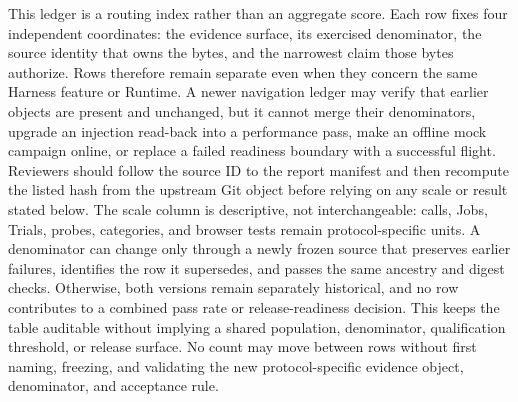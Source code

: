 This ledger is a routing index rather than an aggregate score. Each row fixes
four independent coordinates: the evidence surface, its exercised denominator,
the source identity that owns the bytes, and the narrowest claim those bytes
authorize. Rows therefore remain separate even when they concern the same
Harness feature or Runtime. A newer navigation ledger may verify that earlier
objects are present and unchanged, but it cannot merge their denominators,
upgrade an injection read-back into a performance pass, make an offline mock
campaign online, or replace a failed readiness boundary with a successful
flight. Reviewers should follow the source ID to the report manifest and then
recompute the listed hash from the upstream Git object before relying on any
scale or result stated below. The scale column is descriptive, not
interchangeable: calls, Jobs, Trials, probes, categories, and browser tests
remain protocol-specific units. A denominator can change only through a newly
frozen source that preserves earlier failures, identifies the row it supersedes,
and passes the same ancestry and digest checks. Otherwise, both versions remain
separately historical, and no row contributes to a combined pass rate or
release-readiness decision. This keeps the table auditable without implying a
shared population, denominator, qualification threshold, or release surface.
No count may move between rows without first naming, freezing, and validating
the new protocol-specific evidence object, denominator, and acceptance rule.

